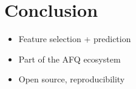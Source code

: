 \section{Conclusion}

\begin{itemize}
  \item Feature selection + prediction
  \item Part of the AFQ ecosystem
  \item Open source, reproducibility
\end{itemize}
